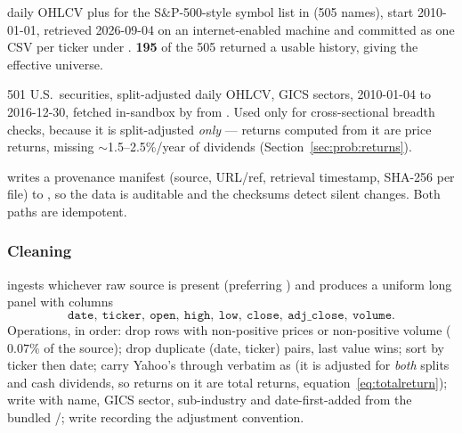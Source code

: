 \begin{description}[leftmargin=0pt,style=nextline]
  \item[Primary --- Yahoo Finance via \code{yfinance}] daily OHLCV plus 
    for the S\&P-500-style symbol list in 
    (505 names), start 2010-01-01, retrieved 2026-09-04 on an internet-enabled machine
    and committed as one CSV per ticker under . \textbf{195} of
    the 505 returned a usable history, giving the effective universe.
  \item[Secondary --- NYSE/Kaggle panel via GitHub tarball] 501 U.S.\ securities,
    split-adjusted daily OHLCV, GICS sectors, 2010-01-04 to 2016-12-30, fetched in-sandbox
    by  from
    . Used only for
    cross-sectional breadth checks, because it is split-adjusted \emph{only} --- returns
    computed from it are price returns, missing $\sim$1.5--2.5\%/year of dividends
    (Section~\ref{sec:prob:returns}).
\end{description}

 writes a provenance manifest (source, URL/ref, retrieval timestamp,
SHA-256 per file) to , so the data is auditable and the checksums
detect silent changes. Both paths are idempotent.

\subsubsection{Cleaning}

 ingests whichever raw source is present (preferring
) and produces a uniform long panel
 with columns
\[
  \texttt{date},\ \texttt{ticker},\ \texttt{open},\ \texttt{high},\ \texttt{low},\
  \texttt{close},\ \texttt{adj\_close},\ \texttt{volume}.
\]
Operations, in order: drop rows with non-positive prices or non-positive volume
($0.07\%$ of the source); drop duplicate (date, ticker) pairs, last value wins; sort by
ticker then date; carry Yahoo's \code{Adj Close} through verbatim as \code{adj\_close}
(it is adjusted for \emph{both} splits and cash dividends, so returns on it are total
returns, equation~\eqref{eq:totalreturn}); write \code{symbols.csv} with name, GICS
sector, sub-industry and date-first-added from the bundled
/; write  recording the
adjustment convention.

